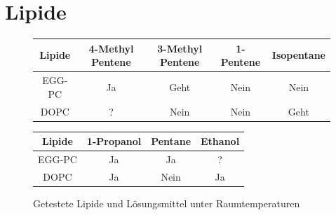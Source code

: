 \section{Lipide}


\begin{figure}[h]
	\begin{tabular}{|c|c|c|c|c|}
		\hline
		Lipide & 4-Methyl Pentene & 3-Methyl Pentene & 1-Pentene & Isopentane \\
		\hline
		EGG-PC & Ja & Geht & Nein & Nein \\
		\hline
		DOPC & ? & Nein & Nein & Geht \\
		\hline
	\end{tabular}
	\begin{tabular}{|c|c|c|c|}
		\hline
		Lipide &  1-Propanol & Pentane & Ethanol \\
		\hline
		EGG-PC & Ja & Ja & ? \\
		\hline
		DOPC & Ja & Nein & Ja \\
		\hline
	\end{tabular}
	\caption{Getestete Lipide und Lösungsmittel unter Raumtemperaturen}
\end{figure}

